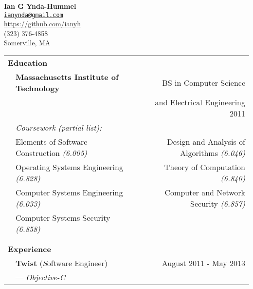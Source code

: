 \documentclass{article}
\begin{document}
\pagestyle{empty}


\begin{center}
  {\Large\bf Ian G Ynda-Hummel}\\
  \href{mailto:ianynda@gmail.com}{\tt ianynda@gmail.com}\\
  \url{https://github.com/ianyh}\\
  (323) 376-4858\\
  Somerville, MA\\
\end{center}


\vspace{2mm}

\begin{tabular}{llr}
 

  \multicolumn{2}{l}{{\Large\bf Education} \vspace{1mm}} & \\
  & {\large\bf Massachusetts Institute of Technology} & BS in Computer Science\\
  & & \vspace{1mm} and Electrical Engineering 2011\\
  & {\it Coursework (partial list): } \\
  & Elements of Software Construction {\it (6.005)}
  & Design and Analysis of Algorithms {\it (6.046)}\\
  & Operating Systems Engineering {\it (6.828)}
  & Theory of Computation {\it (6.840)}\\
  & Computer Systems Engineering {\it (6.033)}
  & Computer and Network Security {\it (6.857)}\\
  & Computer Systems Security {\it (6.858)}\\
  \\

  \cline{2-3}\\



  \multicolumn{2}{l}{{\Large\bf Experience}  \vspace{1mm}} & \\

  & {\large\bf Twist} ({\emph Software Engineer}) & August 2011 - May 2013\\
  & \multicolumn{2}{l}{---  \emph{Objective-C}} \\


\end{tabular}
\end{document}
